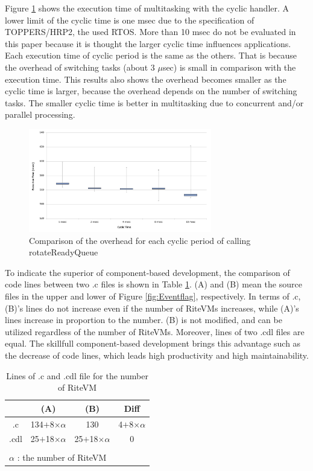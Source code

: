 \documentclass[submit]{ipsj_v2/UTF8/ipsj}
\begin{document}
Figure \ref{fig:comparison_msec} shows the execution time of multitasking with the cyclic handler.
A lower limit of the cyclic time is one msec due to the specification of TOPPERS/HRP2, the used RTOS.
More than 10 msec do not be evaluated in this paper because it is thought the larger cyclic time influences applications.
Each execution time of cyclic period is the same as the others.
That is because the overhead of switching tasks (about 3 $\mu$sec) is small in comparison with the execution time.
This results also shows the overhead becomes smaller as the cyclic time is larger, because the overhead depends on the number of switching tasks.
The smaller cyclic time is better in multitasking due to concurrent and/or parallel processing.

\begin{figure}[t]
    \centering
    \includegraphics[width=8cm,clip]{../EMSOFT2016/figure/comparison_msec.pdf}
    \caption{Comparison of the overhead for each cyclic period of calling rotateReadyQueue}
    \label{fig:comparison_msec}
\end{figure}

To indicate the superior of component-based development, the comparison of code lines between two .c files is shown in Table \ref{tab:codesize}.
(A) and (B) mean the source files in the upper and lower of Figure \ref{fig:Eventflag}, respectively. 
In terms of .c, (B)'s lines do not increase even if the number of RiteVMs increases, while (A)'s lines increase in proportion to the number.
(B) is not modified, and can be utilized regardless of the number of RiteVMs.
Moreover, lines of two .cdl files are equal.
The skillfull component-based development brings this advantage such as the decrease of code lines, which leads high productivity and high maintainability.

\begin{table}[t]
    \centering
    \caption{Lines of .c and .cdl file for the number of RiteVM}
    \begin{tabular}{c||cc|c}
                & (A)       & (B)     & Diff  \\ \hline
        .c      & 134$+$8$\times$$\alpha $  & 130     & 4$+$8$\times$$\alpha$ \\
        .cdl    & 25$+$18$\times$$\alpha$   & 25$+$18$\times$$\alpha$ & 0     \\
        \multicolumn{3}{l}{  }\\
        \multicolumn{3}{l}{{\small $\alpha$} : {\scriptsize the number of RiteVM}}
    \end{tabular}
    \label{tab:codesize}
\end{table}
\end{document}

